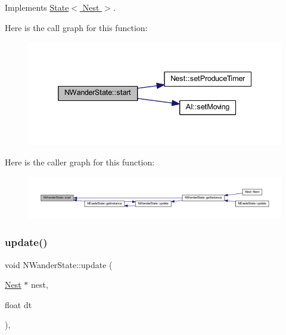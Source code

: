 Implements \hyperlink{class_state_abc29d36b0462a306ac9b32f36571d783}{State$<$ Nest $>$}.

Here is the call graph for this function\+:
\nopagebreak
\begin{figure}[H]
\begin{center}
\leavevmode
\includegraphics[width=338pt]{class_n_wander_state_a8f0f059e756935283e903fa4647a7c3d_cgraph}
\end{center}
\end{figure}
Here is the caller graph for this function\+:
\nopagebreak
\begin{figure}[H]
\begin{center}
\leavevmode
\includegraphics[width=350pt]{class_n_wander_state_a8f0f059e756935283e903fa4647a7c3d_icgraph}
\end{center}
\end{figure}
\mbox{\label{class_n_wander_state_aa6245a3229ba7f0231e4d2bad59a0789}} 
\subsubsection{\texorpdfstring{update()}{update()}}
{\footnotesize\ttfamily void N\+Wander\+State\+::update (\begin{DoxyParamCaption}\item[{\hyperlink{class_nest}{Nest} $\ast$}]{nest,  }\item[{float}]{dt }\end{DoxyParamCaption})\hspace{0.3cm}{\ttfamily [override]}, {\ttfamily [virtual]}}



